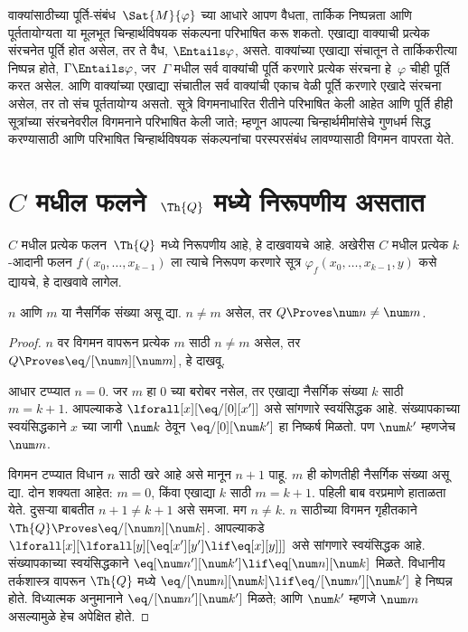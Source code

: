 वाक्यांसाठीच्या पूर्ति-संबंध~$\Sat{M}{\varphi}$ च्या आधारे आपण वैधता,
तार्किक निष्पन्नता आणि पूर्ततायोग्यता या मूलभूत चिन्हार्थविषयक संकल्पना
परिभाषित करू शकतो. एखाद्या वाक्याची प्रत्येक संरचनेत पूर्ति
होत असेल, तर ते वैध, $\Entails \varphi$, असते. वाक्यांच्या एखाद्या
संचातून ते तार्किकरीत्या निष्पन्न होते, $\Gamma \Entails \varphi$, जर~$\Gamma$ मधील
सर्व वाक्यांची पूर्ति करणारे प्रत्येक संरचना हे~$\varphi$ चीही
पूर्ति करत असेल. आणि वाक्यांच्या एखाद्या संचातील सर्व
वाक्यांची एकाच वेळी पूर्ति करणारे एखादे संरचना असेल, तर तो
संच पूर्ततायोग्य असतो. सूत्रे विगमनाधारित रीतीने परिभाषित केली आहेत
आणि पूर्ति हीही सूत्रांच्या संरचनेवरील विगमनाने परिभाषित केली जाते;
म्हणून आपल्या चिन्हार्थमीमांसेचे गुणधर्म सिद्ध करण्यासाठी आणि परिभाषित
चिन्हार्थविषयक संकल्पनांचा परस्परसंबंध लावण्यासाठी विगमन वापरता येते.












\section{$C$ मधील फलने~$\Th{Q}$ मध्ये निरूपणीय असतात}\label{inc:req:cre:sec}

$C$ मधील प्रत्येक फलन~$\Th{Q}$ मध्ये निरूपणीय आहे, हे दाखवायचे
आहे. अखेरीस $C$ मधील प्रत्येक $k$-आदानी फलन
$f(x_0,\dots,x_{k-1})$ ला त्याचे निरूपण करणारे सूत्र
$\varphi_f(x_0,\dots,x_{k-1},y)$ कसे द्यायचे, हे दाखवावे लागेल.

\begin{lem}
$n$ आणि $m$ या नैसर्गिक संख्या असू द्या. $n \neq m$ असेल,
तर $Q \Proves \num n \neq \num m$.
\end{lem}

\begin{proof}
$n$ वर विगमन वापरून प्रत्येक $m$ साठी $n \neq m$ असेल, तर
$Q \Proves \eq/[\num n][\num m]$, हे दाखवू.

आधार टप्प्यात $n = 0$. जर $m$ हा $0$ च्या बरोबर नसेल,
तर एखाद्या नैसर्गिक संख्या $k$ साठी $m = k +
1$. आपल्याकडे $\lforall[x][\eq/[0][x']]$ असे सांगणारे स्वयंसिद्धक
आहे. संख्यापकाच्या स्वयंसिद्धकाने $x$ च्या जागी
$\num k$ ठेवून $\eq/[0][\num k']$ हा निष्कर्ष मिळतो. पण
$\num k'$ म्हणजेच $\num m$.

विगमन टप्प्यात विधान $n$ साठी खरे आहे असे मानून $n+1$
पाहू. $m$ ही कोणतीही नैसर्गिक संख्या असू द्या. दोन शक्यता आहेत:
$m = 0$, किंवा एखाद्या $k$ साठी $m = k+1$. पहिली बाब
वरप्रमाणे हाताळता येते. दुसऱ्या बाबतीत $n+1 \neq
k+1$ असे समजा. मग $n \neq k$. $n$ साठीच्या विगमन गृहीतकाने
$\Th{Q} \Proves \eq/[\num n][\num k]$. आपल्याकडे
$\lforall[x][\lforall[y][\eq[x'][y'] \lif \eq[x][y]]]$
असे सांगणारे स्वयंसिद्धक आहे. संख्यापकाच्या स्वयंसिद्धकाने
$\eq[\num n'][\num k'] \lif \eq[\num n][\num
  k]$ मिळते. विधानीय तर्कशास्त्र वापरून $\Th{Q}$ मध्ये
$\eq/[\num n][\num k] \lif \eq/[\num n'][\num k']$
हे निष्पन्न होते. विध्यात्मक अनुमानाने
$\eq/[\num n'][\num k']$ मिळते; आणि $\num k'$ म्हणजे
$\num m$ असल्यामुळे हेच अपेक्षित होते.
\end{proof}

